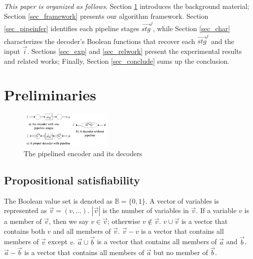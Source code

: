 \documentclass[conference]{IEEEtran}
\begin{document}
\emph{This paper is organized as follows}.
Section \ref{sec_prem} introduces the background material;
Section \ref{sec_framework} presents our algorithm framework.
Section \ref{sec_pipeinfer} identifies each pipeline stages $\vec{stg}^j$,
while Section \ref{sec_char} characterizes the decoder's Boolean functions that recover each $\vec{stg}^j$ and the input $\vec{i}$.
Sections \ref{sec_exp} and \ref{sec_relwork} present the experimental results and related works;
Finally,
Section \ref{sec_conclude} sums up the conclusion.

\section{Preliminaries}\label{sec_prem}


\begin{figure}[t]
\begin{center}
\includegraphics[width=0.4\textwidth]{pipeline}
\end{center}
\caption{The pipelined encoder and its decoders}
\label{fig_pipe}
\end{figure}

\subsection{Propositional satisfiability}\label{subsec_SAT}
The Boolean value set is denoted as $\mathbb{B}=\{0,1\}$.
A vector of variables is represented as $\vec{v}=(v,\dots)$.
$|\vec{v}|$ is the number of variables in $\vec{v}$. 
If a variable $v$ is a member of $\vec{v}$,
then we say $v\in\vec{v}$;
otherwise $v\notin\vec{v}$.
$v\cup\vec{v}$ is a vector that contains both $v$ and all members of $\vec{v}$.
$\vec{v}-v$ is a vector that contains all members of $\vec{v}$ except $v$.
$\vec{a}\cup\vec{b}$ is a vector that contains  all members of $\vec{a}$ and $\vec{b}$.
$\vec{a}-\vec{b}$ is a vector that contains  all members of $\vec{a}$ but no member of $\vec{b}$.
\end{document}
